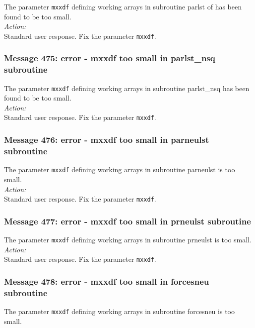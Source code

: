 The parameter {\tt mxxdf} defining  working arrays in subroutine {\sc parlst}
of \D{} has been found to be too small. \\

\noindent
{\em Action:}\\ 
Standard user response. Fix the parameter {\tt mxxdf}.

\subsubsection*{Message 475: error - mxxdf too small in parlst\_nsq subroutine}

The parameter {\tt mxxdf} defining working arrays in subroutine {\sc
parlst\_nsq} \D{} has been found to be too small. \\

\noindent
{\em Action:}\\ 
Standard user response. Fix the parameter {\tt mxxdf}.

\subsubsection*{Message 476: error - mxxdf too small in parneulst subroutine}

The parameter {\tt mxxdf} defining working arrays in subroutine {\sc
parneulst} is too small. \\

\noindent
{\em Action:}\\ Standard user response. Fix the parameter {\tt mxxdf}.

\subsubsection*{Message 477: error - mxxdf too small in prneulst subroutine}

The parameter {\tt mxxdf} defining working arrays in subroutine {\sc
prneulst} is too small.\\

\noindent
{\em Action:}\\ Standard user response. Fix the parameter {\tt mxxdf}.

\subsubsection*{Message 478: error - mxxdf too small in forcesneu subroutine}

The parameter {\tt mxxdf} defining working arrays in subroutine {\sc
forcesneu} is too small. \\

